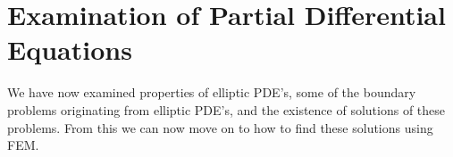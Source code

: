 \chapter{Examination of Partial Differential Equations}


%








We have now examined properties of elliptic PDE's, some of the boundary problems 
originating from elliptic PDE's, and the existence of solutions of these problems. 
From this we can now move on to how to find these solutions using FEM.